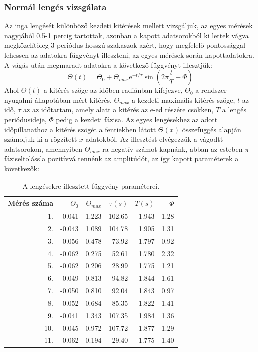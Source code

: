 \documentclass[10pt,pdftex]{report}
\begin{document}
\subsubsection*{Normál lengés vizsgálata}
Az inga lengését különböző kezdeti kitérések mellett vizsgáljuk, az egyes mérések nagyjából 0.5-1 percig tartottak, azonban a kapott adatsorokból ki lettek vágva megközelítőleg 
3 periódus hosszú szakaszok azért, hogy megfelelő pontossággal lehessen az adatokra függvényt illeszteni, az egyes mérések során kapottadatokra. A vágás után megmaradt adatokra a 
következő függvényt illesztjük:
\begin{equation*}
    \Theta\left(t\right)=\Theta_0+\Theta_{max}\mathrm{e}^{-t/\tau}\sin\left(2\pi\frac{t}{T}+\Phi\right)
\end{equation*}
Ahol $\Theta\left(t\right)$ a kitérés szöge az időben radiánban kifejezve, $\Theta_0$ a rendszer nyugalmi állapotában mért kitérés, $\Theta_{max}$ a kezdeti maximális kitérés szöge, 
$t$ az idő, $\tau$ az az időtartam, amely alatt a kitérés az $\mathrm{e}$-ed részére csökken, $T$ a lengés periódusideje, $\Phi$ pedig a kezdeti fázisa. Az egyes lengésekhez az adott 
időpillanathoz a kitérés szögét a fentiekben látott $\Theta(x)$ összefüggés alapján számoljuk ki a rögzített $x$ adatokból. Az illesztést elvégezzük a vágodtt adatsorokon, amennyiben 
$\Theta_{max}$-ra negatív számot kapnánk, abban az esteben $\pi$ fáziseltolássla pozitívvá tennénk az amplitúdót, az így kapott paraméterek a következők:
\begin{table}[H]
    \centering
    \begin{tabular}{|r|r|r|r|r|r|}
        \hline
        Mérés száma & $\Theta_0$ & $\Theta_{max}$ & $\tau(s)$ & $T(s)$ & $\Phi$ \\
        \hline
        1. & -0.041 & 1.223 & 102.65 & 1.943 & 1.28 \\
        \hline
        2. & -0.043 & 1.089 & 104.78 & 1.905 & 1.31 \\
        \hline
        3. & -0.056 & 0.478 & 73.92 & 1.797 & 0.92 \\
        \hline
        4. & -0.062 & 0.275 & 52.61 & 1.780 & 2.32 \\
        \hline
        5. & -0.062 & 0.206 & 28.99 & 1.775 & 1.21 \\
        \hline
        6. & -0.049 & 0.813 & 94.82 & 1.844 & 1.61 \\
        \hline
        7. & -0.050 & 0.810 & 92.04 & 1.843 & 0.97 \\
        \hline
        8. & -0.052 & 0.684 & 85.35 & 1.822 & 1.41 \\
        \hline
        9. & -0.041 & 1.343 & 107.35 & 1.984 & 1.36 \\
        \hline
        10. & -0.045 & 0.972 & 107.72 & 1.877 & 1.29 \\
        \hline
        11. & -0.062 & 0.194 & 29.40 & 1.775 & 1.40 \\
        \hline
    \end{tabular}
    \caption{A lengésekre illesztett függvény paraméterei.}
\end{table}
\end{document}
